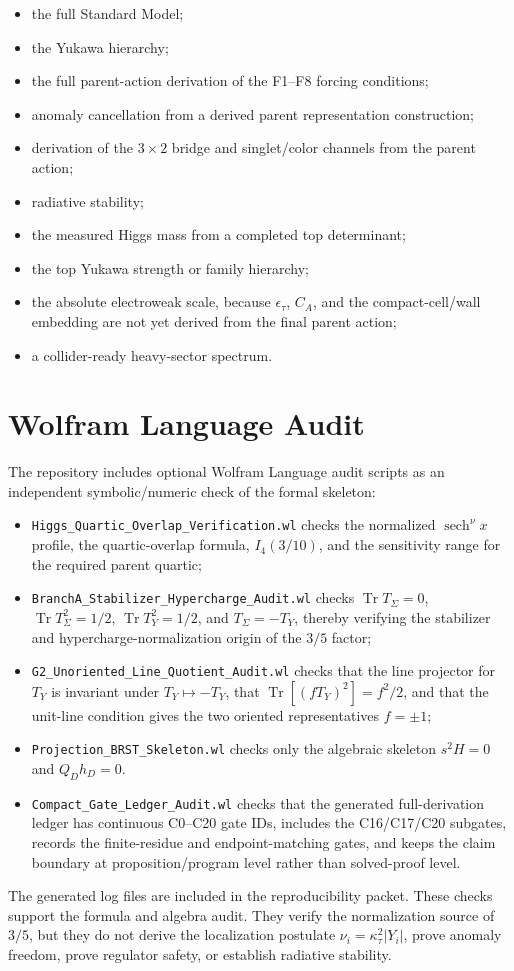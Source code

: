 \documentclass[11pt]{article}
\begin{document}
\begin{itemize}
\item the full Standard Model;
\item the Yukawa hierarchy;
\item the full parent-action derivation of the F1--F8 forcing conditions;
\item anomaly cancellation from a derived parent representation construction;
\item derivation of the $3\times2$ bridge and singlet/color channels from the parent action;
\item radiative stability;
\item the measured Higgs mass from a completed top determinant;
\item the top Yukawa strength or family hierarchy;
\item the absolute electroweak scale, because $\epsilon_\tau$, $C_A$, and the
compact-cell/wall embedding are not yet derived from the final parent action;
\item a collider-ready heavy-sector spectrum.
\end{itemize}

\section{Wolfram Language Audit}
The repository includes optional Wolfram Language audit scripts as an independent symbolic/numeric check of the formal skeleton:
\begin{itemize}
\item \texttt{Higgs\_Quartic\_Overlap\_Verification.wl} checks the normalized $\operatorname{sech}^\nu x$ profile, the quartic-overlap formula, $I_4(3/10)$, and the sensitivity range for the required parent quartic;
\item \texttt{BranchA\_Stabilizer\_Hypercharge\_Audit.wl} checks $\operatorname{Tr}T_\Sigma=0$, $\operatorname{Tr}T_\Sigma^2=1/2$, $\operatorname{Tr}T_Y^2=1/2$, and $T_\Sigma=-T_Y$, thereby verifying the stabilizer and hypercharge-normalization origin of the $3/5$ factor;
\item \texttt{G2\_Unoriented\_Line\_Quotient\_Audit.wl} checks that the line projector for $T_Y$ is invariant under $T_Y\mapsto -T_Y$, that $\operatorname{Tr}[(fT_Y)^2]=f^2/2$, and that the unit-line condition gives the two oriented representatives $f=\pm1$;
\item \texttt{Projection\_BRST\_Skeleton.wl} checks only the algebraic skeleton $s^2H=0$ and $Q_Dh_D=0$.
\item \texttt{Compact\_Gate\_Ledger\_Audit.wl} checks that the generated full-derivation ledger has continuous C0--C20 gate IDs, includes the C16/C17/C20 subgates, records the finite-residue and endpoint-matching gates, and keeps the claim boundary at proposition/program level rather than solved-proof level.
\end{itemize}
The generated log files are included in the reproducibility packet. These checks support the formula and algebra audit. They verify the normalization source of $3/5$, but they do not derive the localization postulate $\nu_i=\kappa_\tau^2|Y_i|$, prove anomaly freedom, prove regulator safety, or establish radiative stability.
\end{document}
